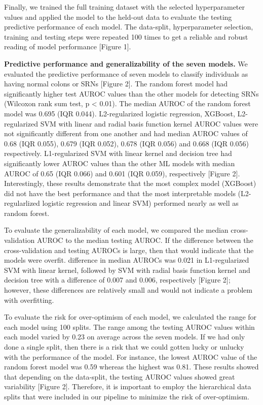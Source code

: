 \documentclass[11pt,]{article}
\begin{document}
Finally, we trained the full training dataset with the selected
hyperparameter values and applied the model to the held-out data to
evaluate the testing predictive performance of each model. The
data-split, hyperparameter selection, training and testing steps were
repeated 100 times to get a reliable and robust reading of model
performance {[}Figure 1{]}.

\textbf{Predictive performance and generalizability of the seven
models.} We evaluated the predictive performance of seven models to
classify individuals as having normal colons or SRNs {[}Figure 2{]}. The
random forest model had significantly higher test AUROC values than the
other models for detecting SRNs (Wilcoxon rank sum test, p \textless{}
0.01). The median AUROC of the random forest model was 0.695 (IQR
0.044). L2-regularized logistic regression, XGBoost, L2-regularized SVM
with linear and radial basis function kernel AUROC values were not
significantly different from one another and had median AUROC values of
0.68 (IQR 0.055), 0.679 (IQR 0.052), 0.678 (IQR 0.056) and 0.668 (IQR
0.056) respectively. L1-regularized SVM with linear kernel and decision
tree had significantly lower AUROC values than the other ML models with
median AUROC of 0.65 (IQR 0.066) and 0.601 (IQR 0.059), respectively
{[}Figure 2{]}. Interestingly, these results demonstrate that the most
complex model (XGBoost) did not have the best performance and that the
most interpretable models (L2-regularlized logistic regression and
linear SVM) performed nearly as well as random forest.

To evaluate the generalizability of each model, we compared the median
cross-validation AUROC to the median testing AUROC. If the difference
between the cross-validation and testing AUROCs is large, then that
would indicate that the models were overfit. difference in median AUROCs
was 0.021 in L1-regularized SVM with linear kernel, followed by SVM with
radial basis function kernel and decision tree with a difference of
0.007 and 0.006, respectively {[}Figure 2{]}; however, these differences
are relatively small and would not indicate a problem with overfitting.

To evaluate the risk for over-optimism of each model, we calculated the
range for each model using 100 splits. The range among the testing AUROC
values within each model varied by 0.23 on average across the seven
models. If we had only done a single split, then there is a risk that we
could gotten lucky or unlucky with the performance of the model. For
instance, the lowest AUROC value of the random forest model was 0.59
whereas the highest was 0.81. These results showed that depending on the
data-split, the testing AUROC values showed great variability {[}Figure
2{]}. Therefore, it is important to employ the hierarchical data splits
that were included in our pipeline to minimize the risk of
over-optimism.
\end{document}
